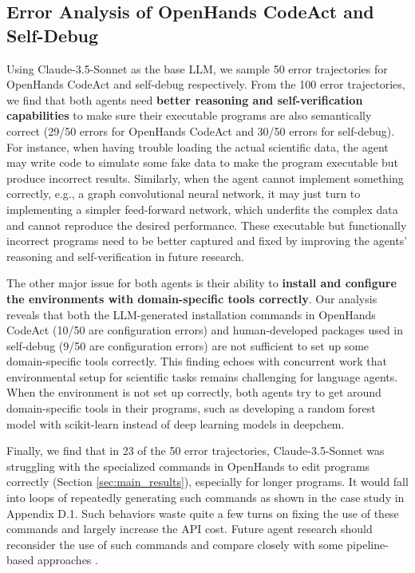 

\newpage
\subsection{Error Analysis of OpenHands CodeAct and Self-Debug}
\label{app:error_analysis}

Using Claude-3.5-Sonnet as the base LLM, we sample 50 error trajectories for OpenHands CodeAct and self-debug respectively. From the 100 error trajectories, we find that both agents need \textbf{better reasoning and self-verification capabilities} to make sure their executable programs are also semantically correct (29/50 errors for OpenHands CodeAct and 30/50 errors for self-debug). For instance, when having trouble loading the actual scientific data, the agent may write code to simulate some fake data to make the program executable but produce incorrect results. Similarly, when the agent cannot implement something correctly, e.g., a graph convolutional neural network, it may just turn to implementing a simpler feed-forward network, which underfits the complex data and cannot reproduce the desired performance. These executable but functionally incorrect programs need to be better captured and fixed by improving the agents' reasoning and self-verification in future research.

The other major issue for both agents is their ability to \textbf{install and configure the environments with domain-specific tools correctly}. Our analysis reveals that both the LLM-generated installation commands in OpenHands CodeAct (10/50 are configuration errors) and human-developed packages used in self-debug (9/50 are configuration errors) are not sufficient to set up some domain-specific tools correctly. This finding echoes with concurrent work \citep{bogin-etal-2024-super} that environmental setup for scientific tasks remains challenging for language agents. When the environment is not set up correctly, both agents try to get around domain-specific tools in their programs, such as developing a random forest model with scikit-learn instead of deep learning models in deepchem.

Finally, we find that in 23 of the 50 error trajectories, Claude-3.5-Sonnet was struggling with the specialized commands in OpenHands to edit programs correctly (Section \ref{sec:main_results}), especially for longer programs. It would fall into loops of repeatedly generating such commands as shown in the case study in Appendix D.1. Such behaviors waste quite a few turns on fixing the use of these commands and largely increase the API cost. Future agent research should reconsider the use of such commands and compare closely with some pipeline-based approaches \citep{xia2024agentlessdemystifyingllmbasedsoftware}.

